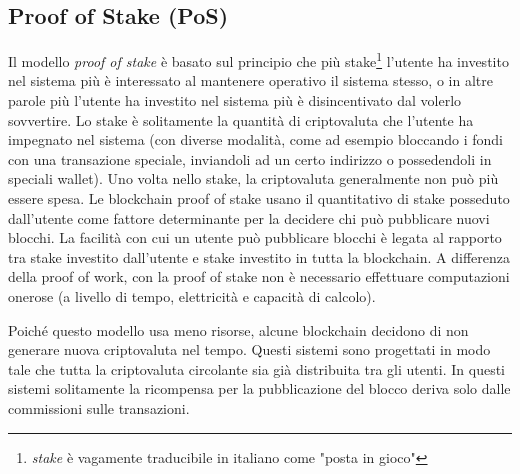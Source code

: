 \subsection{Proof of Stake (PoS)}
Il modello \textit{proof of stake} è basato sul principio che più stake\footnote{
	\textit{stake} è vagamente traducibile in italiano	come "posta in gioco"}
l'utente ha investito nel sistema
più è interessato al mantenere operativo il sistema stesso, o in altre parole più l'utente ha investito
nel sistema più è disincentivato dal volerlo sovvertire.
Lo stake è solitamente la quantità di criptovaluta che l'utente ha impegnato nel sistema (con
diverse modalità, come ad esempio bloccando i fondi con una transazione speciale, inviandoli ad un certo
indirizzo o possedendoli in speciali wallet). Uno volta nello stake, la criptovaluta generalmente non
può più essere spesa. Le blockchain proof of stake usano il quantitativo di stake posseduto dall'utente
come fattore determinante per la decidere chi può pubblicare nuovi blocchi. La facilità con cui un utente
può pubblicare blocchi è legata al rapporto tra stake investito dall'utente e stake
investito in tutta la blockchain. A differenza della proof of work, con la proof of stake
non è necessario effettuare computazioni onerose (a livello di tempo, elettricità e capacità di calcolo).

Poiché questo modello usa meno risorse, alcune blockchain decidono di non generare nuova criptovaluta
nel tempo. Questi sistemi sono progettati in modo tale che tutta la criptovaluta circolante
sia già distribuita tra gli utenti.
In questi sistemi solitamente la ricompensa per la pubblicazione del blocco deriva
solo dalle commissioni sulle transazioni.

